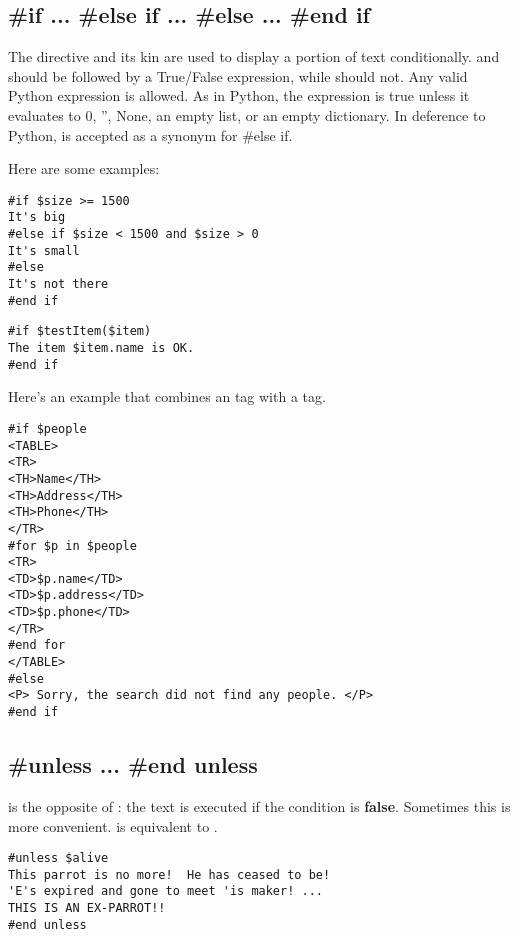 \subsection{\#if ... \#else if ... \#else ... \#end if}
\label{flowControl.if}

The  directive and its kin are used to display a portion of text
conditionally.  and  should be followed by a
True/False expression, while  should not.  Any valid Python 
expression is allowed.  As in Python, the expression is true unless it evaluates
to 0, '', None, an empty list, or an empty dictionary.  In deference to Python,
 is accepted as a synonym for {\#else if}.

Here are some examples:
\begin{verbatim}
#if $size >= 1500
It's big
#else if $size < 1500 and $size > 0 
It's small
#else
It's not there
#end if
\end{verbatim}

\begin{verbatim}
#if $testItem($item)
The item $item.name is OK.
#end if
\end{verbatim}

Here's an example that combines an  tag with a  tag.
\begin{verbatim}
#if $people
<TABLE>
<TR>
<TH>Name</TH>
<TH>Address</TH>
<TH>Phone</TH>
</TR>
#for $p in $people
<TR>
<TD>$p.name</TD>
<TD>$p.address</TD>
<TD>$p.phone</TD>
</TR>
#end for
</TABLE>
#else
<P> Sorry, the search did not find any people. </P>
#end if
\end{verbatim}


\subsection{\#unless ... \#end unless}
\label{flowControl.unless}

 is the opposite of : the text is executed if the
condition is {\bf false}.  Sometimes this is more convenient.
 is equivalent to .

\begin{verbatim}
#unless $alive
This parrot is no more!  He has ceased to be!
'E's expired and gone to meet 'is maker! ...
THIS IS AN EX-PARROT!!
#end unless
\end{verbatim}

